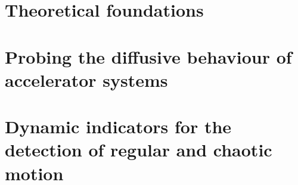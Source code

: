 \documentclass[12pt,twoside,a4paper]{book}
\begin{document}
\frontmatter
{}

\cleardoublepage

%
 
%

%
\cleardoublepage

\cleardoublepage

%

%
% 
%

\tableofcontents
{}
%
\mainmatter

\part{Theoretical foundations}\label{part:th}





\part{Probing the diffusive behaviour of accelerator systems}\label{part:diff}





\part{Dynamic indicators for the detection of regular and chaotic motion}\label{part:dyn}






% 

\sloppy
\printbibliography
{}  
\sectionmark{}
\fussy


% 
\end{document}
